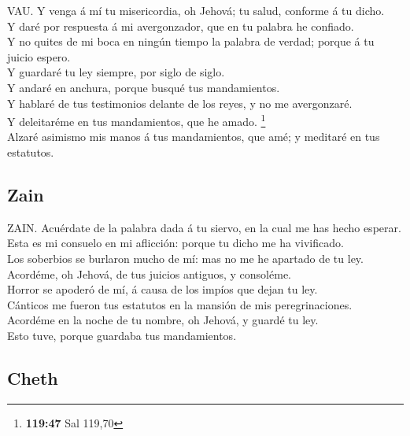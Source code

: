  VAU. Y venga á mí tu misericordia, oh Jehová; tu salud,
conforme á tu dicho.\\
 Y daré por respuesta á mi avergonzador, que en tu
palabra he confiado.\\
 Y no quites de mi boca en ningún tiempo la palabra de
verdad; porque á tu juicio espero.\\
 Y guardaré tu ley siempre, por siglo de siglo.\\
 Y andaré en anchura, porque busqué tus mandamientos.\\
 Y hablaré de tus testimonios delante de los reyes, y no
me avergonzaré.\\
 Y deleitaréme en tus mandamientos, que he amado.
\footnote{\textbf{119:47} Sal 119,70}\\
 Alzaré asimismo mis manos á tus mandamientos, que amé; y
meditaré en tus estatutos.

\hypertarget{zain}{%
\subsection{Zain}\label{zain}}

 ZAIN. Acuérdate de la palabra dada á tu siervo, en la
cual me has hecho esperar.\\
 Esta es mi consuelo en mi aflicción: porque tu dicho me
ha vivificado.\\
 Los soberbios se burlaron mucho de mí: mas no me he
apartado de tu ley.\\
 Acordéme, oh Jehová, de tus juicios antiguos, y
consoléme.\\
 Horror se apoderó de mí, á causa de los impíos que dejan
tu ley.\\
 Cánticos me fueron tus estatutos en la mansión de mis
peregrinaciones.\\
 Acordéme en la noche de tu nombre, oh Jehová, y guardé
tu ley.\\
 Esto tuve, porque guardaba tus mandamientos.

\hypertarget{cheth}{%
\subsection{Cheth}\label{cheth}}

